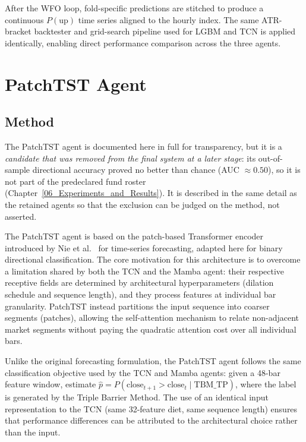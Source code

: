 After the WFO loop, fold-specific predictions are stitched to produce a continuous $P(\text{up})$ time series aligned to the hourly index. The same ATR-bracket backtester and grid-search pipeline used for LGBM and TCN is applied identically, enabling direct performance comparison across the three agents.

\section{PatchTST Agent}
\label{sec:patchtst_agent}

\subsection{Method}

The PatchTST agent is documented here in full for transparency, but it is a \textit{candidate that was removed from the final system at a later stage}: its out-of-sample directional accuracy proved no better than chance (AUC $\approx 0.50$), so it is not part of the predeclared fund roster (Chapter~\ref{06_Experiments_and_Results}). It is described in the same detail as the retained agents so that the exclusion can be judged on the method, not asserted.


The PatchTST agent is based on the patch-based Transformer encoder introduced by Nie et al.~\cite{nie2023patchtst} for time-series forecasting, adapted here for binary directional classification. The core motivation for this architecture is to overcome a limitation shared by both the TCN and the Mamba agent: their respective receptive fields are determined by architectural hyperparameters (dilation schedule and sequence length), and they process features at individual bar granularity. PatchTST instead partitions the input sequence into coarser segments (patches), allowing the self-attention mechanism to relate non-adjacent market segments without paying the quadratic attention cost over all individual bars.


Unlike the original forecasting formulation, the PatchTST agent follows the same classification objective used by the TCN and Mamba agents: given a 48-bar feature window, estimate $\hat{p} = P(\text{close}_{t+1} > \text{close}_t \mid \text{TBM\_TP})$, where the label is generated by the Triple Barrier Method. The use of an identical input representation to the TCN (same 32-feature diet, same sequence length) ensures that performance differences can be attributed to the architectural choice rather than the input.


